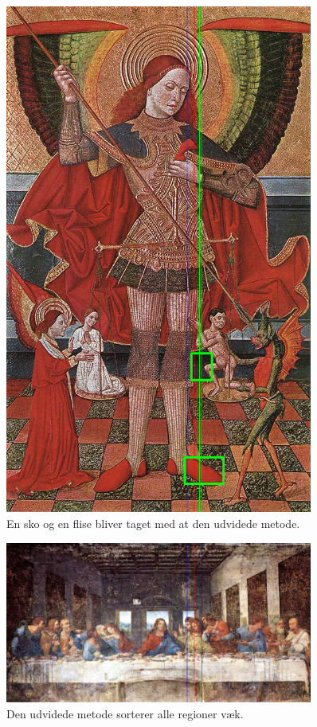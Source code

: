 \begin{figure}[h!!]
	\begin{center}
		\includegraphics[width=0.9\textwidth,angle=0]{afsnit/afprovning/billeder/udvidet_losning/udvidet_kfarver_kdetaljer.png}
	\end{center}
	\caption[]{En sko og en flise bliver taget med at den udvidede metode.}
	\label{udvidet_virker_ikke1}
\end{figure}

\begin{figure}[h!!]
	\begin{center}
		\includegraphics[width=0.9\textwidth,angle=0]{afsnit/afprovning/billeder/udvidet_losning/udvidet_mfarver_mdetaljer.png}
	\end{center}
	\caption[]{Den udvidede metode sorterer alle regioner væk.}
	\label{udvidet_virker_ikke2}
\end{figure}

